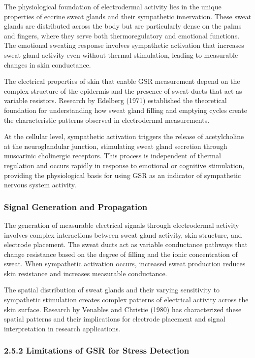 \documentclass[12pt,a4paper]{article}
\begin{document}
The physiological foundation of electrodermal activity lies in the unique properties of eccrine sweat glands and their
sympathetic innervation. These sweat glands are distributed across the body but are particularly dense on the palms and
fingers, where they serve both thermoregulatory and emotional functions. The emotional sweating response involves
sympathetic activation that increases sweat gland activity even without thermal stimulation, leading to measurable
changes in skin conductance.

The electrical properties of skin that enable GSR measurement depend on the complex structure of the epidermis and the
presence of sweat ducts that act as variable resistors. Research by Edelberg (1971) established the theoretical
foundation for understanding how sweat gland filling and emptying cycles create the characteristic patterns observed in
electrodermal measurements.

At the cellular level, sympathetic activation triggers the release of acetylcholine at the neuroglandular junction,
stimulating sweat gland secretion through muscarinic cholinergic receptors. This process is independent of thermal
regulation and occurs rapidly in response to emotional or cognitive stimulation, providing the physiological basis for
using GSR as an indicator of sympathetic nervous system activity.

\subsubsection{Signal Generation and Propagation}

The generation of measurable electrical signals through electrodermal activity involves complex interactions between
sweat gland activity, skin structure, and electrode placement. The sweat ducts act as variable conductance pathways that
change resistance based on the degree of filling and the ionic concentration of sweat. When sympathetic activation
occurs, increased sweat production reduces skin resistance and increases measurable conductance.

The spatial distribution of sweat glands and their varying sensitivity to sympathetic stimulation creates complex
patterns of electrical activity across the skin surface. Research by Venables and Christie (1980) has characterized
these spatial patterns and their implications for electrode placement and signal interpretation in research
applications.

\subsubsection{2.5.2 Limitations of GSR for Stress Detection}
\end{document}
